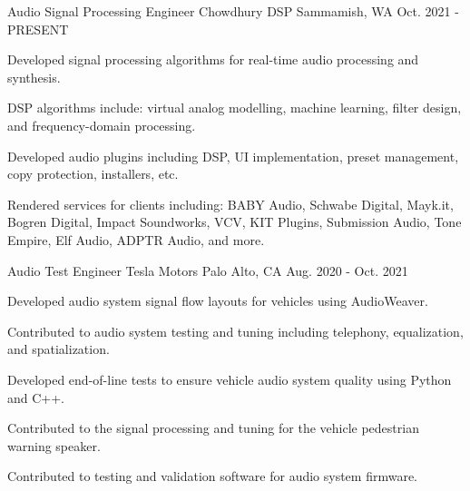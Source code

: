 

\begin{cventries}

  \cventry
    {Audio Signal Processing Engineer} %
    {Chowdhury DSP} %
    {Sammamish, WA} %
    {Oct. 2021 - PRESENT} %
    {
      \begin{cvitems} %
        \item {Developed signal processing algorithms for real-time audio processing and synthesis.}
        \item {DSP algorithms include: virtual analog modelling, machine learning, filter design, and frequency-domain processing.}
        \item {Developed audio plugins including DSP, UI implementation, preset management, copy protection, installers, etc.}
        \item {Rendered services for clients including: BABY Audio, Schwabe Digital, Mayk.it, Bogren Digital, Impact Soundworks,
        VCV, KIT Plugins, Submission Audio, Tone Empire, Elf Audio, ADPTR Audio, and more.}
      \end{cvitems}
    }

  \cventry
    {Audio Test Engineer} %
    {Tesla Motors} %
    {Palo Alto, CA} %
    {Aug. 2020 - Oct. 2021} %
    {
      \begin{cvitems} %
        \item {Developed audio system signal flow layouts for vehicles using AudioWeaver.}
        \item {Contributed to audio system testing and tuning including telephony, equalization, and spatialization.}
        \item {Developed end-of-line tests to ensure vehicle audio system quality using Python and C++.}
        \item {Contributed to the signal processing and tuning for the vehicle pedestrian warning speaker.}
        \item {Contributed to testing and validation software for audio system firmware.}
      \end{cvitems}
    }


\end{cventries}
